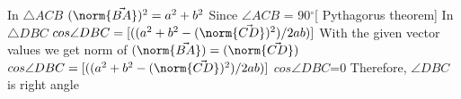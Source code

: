 In $\triangle ACB$  $(\norm{\vec{BA}})^2= a^2+b^2$
Since $\angle ACB$ = 90$^{\circ}$[ Pythagorus theorem]
\newline
In $\triangle DBC$ 
$cos \angle DBC= [((a^2+b^2-(\norm{\vec{CD}})^2)/2ab)] $
With the given vector values we get norm of $(\norm{\vec{BA}})=(\norm{\vec{CD}})$
\newline
$cos\angle DBC =[((a^2+b^2-(\norm{\vec{CD}})^2)/2ab)]$
$cos\angle DBC$=0
\newline
Therefore, $\angle DBC$ is right angle
